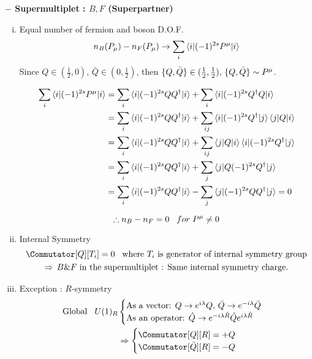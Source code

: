 \documentclass[11pt,letterpaper]{article}
\begin{document}
{\bfseries $-$ Supermultiplet : $B, F$ (Superpartner)}
\begin{enumerate}[(i)]
	\item Equal number of fermion and boson D.O.F. \newline
	$$
	n_B(P_\mu) - n_F(P_\mu) \rightarrow \sum_i\braket{i|(-1)^{2s}P^\mu|i}
	$$ \newline
	Since $Q \in (\frac{1}{2}, 0),\, \bar{Q}\in(0,\frac{1}{2})$, then $\{ Q , \bar{Q} \} \in (\frac{1}{2}, \frac{1}{2}),\, \{ Q , \bar{Q} \} \sim P^\mu$.
	
	\begin{align*}
	\sum_i\braket{i|(-1)^{2s}P^\mu|i} &= \sum_i\braket{i|(-1)^{2s}QQ^{\dagger}|i} + \sum_i\braket{i|(-1)^{2s}Q^\dagger Q|i} \\
	&= \sum_i\braket{i|(-1)^{2s}QQ^{\dagger}|i} + \sum_{ij}\braket{i|(-1)^{2s}Q^\dagger|j}\braket{j|Q|i} \\
	&= \sum_i\braket{i|(-1)^{2s}QQ^{\dagger}|i} + \sum_{ij}\braket{j|Q|i}\braket{i|(-1)^{2s}Q^\dagger|j} \\
	&= \sum_i\braket{i|(-1)^{2s}QQ^{\dagger}|i} + \sum_j\braket{j|Q(-1)^{2s}Q^\dagger|j} \\
	&= \sum_i\braket{i|(-1)^{2s}QQ^{\dagger}|i} - \sum_j\braket{j|(-1)^{2s}QQ^\dagger|j} = 0
	\end{align*}
	
	$$ \therefore n_B - n_F = 0 \hspace{0.3cm} for \hspace{0.1cm} P^\mu \neq 0$$
	
	\item Internal Symmetry \newline
	$$
	\begin{gathered}
	\Commutator[Q][T_i] = 0 \HS \text{where $T_i$ is generator of internal symmetry group} \\
	\Rightarrow\, B\&F \hs  \text{in the supermultiplet : Same internal symmetry charge.} 
	\end{gathered}
	$$
	
	\item Exception : $R$-symmetry \newline
	$$
	\begin{aligned}
		\text{Global}\HS U(1)_R &
		\begin{cases}
			\text{As a vector: } Q\rightarrow e^{i\lambda}Q,\, \bar{Q} \rightarrow e^{-i\lambda}\bar{Q} \\
			\text{As an operator: } \hat{Q}\rightarrow e^{-i\lambda\hat{R}}\hat{Q}e^{i\lambda\hat{R}}
		\end{cases} \\
		& \Rightarrow 
		\begin{cases}
			\Commutator[Q][R] = +Q \\
			\Commutator[\bar{Q}][R] = -Q
		\end{cases}
	\end{aligned}
	$$
\end{enumerate}
\end{document}
